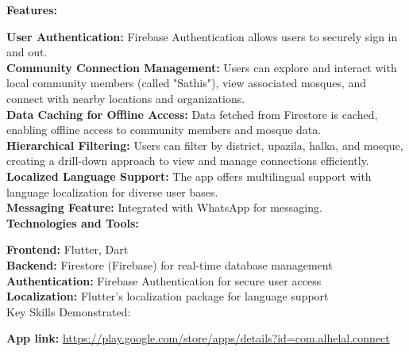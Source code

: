 \documentclass[a4paper,12pt]{article}
\begin{document}
\begin{CV}
\textbf{Features:}

\textbf{User Authentication:} Firebase Authentication allows users to securely sign in and out.\\
\textbf{Community Connection Management:} Users can explore and interact with local community members (called "Sathis"), view associated mosques, and connect with nearby locations and organizations.\\
\textbf{Data Caching for Offline Access:} Data fetched from Firestore is cached, enabling offline access to community members and mosque data.\\
\textbf{Hierarchical Filtering:} Users can filter by district, upazila, halka, and mosque, creating a drill-down approach to view and manage connections efficiently.\\
\textbf{Localized Language Support:} The app offers multilingual support with language localization for diverse user bases.\\
\textbf{Messaging Feature:} Integrated with WhatsApp for messaging.\\
\textbf{Technologies and Tools:}

\textbf{Frontend:} Flutter, Dart\\
\textbf{Backend:} Firestore (Firebase) for real-time database management\\
\textbf{Authentication:} Firebase Authentication for secure user access\\
\textbf{Localization:} Flutter’s localization package for language support\\
Key Skills Demonstrated:

\textbf{App link:} \href{https://play.google.com/store/apps/details?id=com.alhelal.connect}{https://play.google.com/store/apps/details?id=com.alhelal.connect}
\end{CV}
\end{document}
